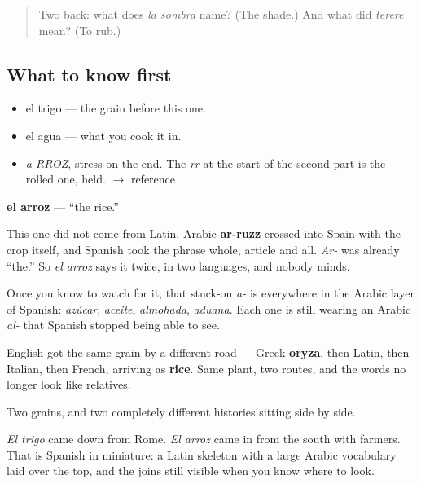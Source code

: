\label{lesson:ES-C290-arroz}



\begin{quote}
Two back: what does \emph{la sombra} name? (The shade.) And what did \emph{terere} mean? (To rub.)
\end{quote}

\subsection*{What to know first}
\begin{itemize}
\raggedright
  \item el trigo — the grain before this one.
  \item el agua — what you cook it in.
\end{itemize}

\begin{sounds}
\begin{itemize}
\raggedright
  \item \emph{a-RROZ}, stress on the end. The \emph{rr} at the start of the second part is the rolled one, held. $\to$ reference
\end{itemize}
\end{sounds}

\begin{cousinweb}
\textbf{el arroz} — \textquotedblleft{}the rice.\textquotedblright{}

This one did not come from Latin. Arabic \textbf{ar-ruzz} crossed into Spain with the crop itself, and Spanish took the phrase whole, article and all. \emph{Ar-} was already \textquotedblleft{}the.\textquotedblright{} So \emph{el arroz} says it twice, in two languages, and nobody minds.

Once you know to watch for it, that stuck-on \emph{a-} is everywhere in the Arabic layer of Spanish: \emph{azúcar}, \emph{aceite}, \emph{almohada}, \emph{aduana}. Each one is still wearing an Arabic \emph{al-} that Spanish stopped being able to see.

English got the same grain by a different road — Greek \textbf{oryza}, then Latin, then Italian, then French, arriving as \textbf{rice}. Same plant, two routes, and the words no longer look like relatives.
\end{cousinweb}

\begin{grammarlens}[title={What you've built}]
Two grains, and two completely different histories sitting side by side.

\emph{El trigo} came down from Rome. \emph{El arroz} came in from the south with farmers. That is Spanish in miniature: a Latin skeleton with a large Arabic vocabulary laid over the top, and the joins still visible when you know where to look.
\end{grammarlens}

